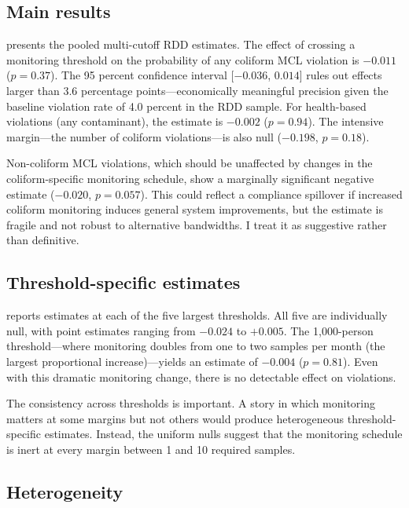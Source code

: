 \documentclass[12pt]{article}
\begin{document}
\subsection{Main results}



 presents the pooled multi-cutoff RDD estimates. The effect of crossing a monitoring threshold on the probability of any coliform MCL violation is $-0.011$ ($p = 0.37$). The 95 percent confidence interval [$-0.036$, $0.014$] rules out effects larger than 3.6 percentage points---economically meaningful precision given the baseline violation rate of 4.0 percent in the RDD sample. For health-based violations (any contaminant), the estimate is $-0.002$ ($p = 0.94$). The intensive margin---the number of coliform violations---is also null ($-0.198$, $p = 0.18$).

Non-coliform MCL violations, which should be unaffected by changes in the coliform-specific monitoring schedule, show a marginally significant negative estimate ($-0.020$, $p = 0.057$). This could reflect a compliance spillover if increased coliform monitoring induces general system improvements, but the estimate is fragile and not robust to alternative bandwidths. I treat it as suggestive rather than definitive.

\subsection{Threshold-specific estimates}



 reports estimates at each of the five largest thresholds. All five are individually null, with point estimates ranging from $-0.024$ to $+0.005$. The 1,000-person threshold---where monitoring doubles from one to two samples per month (the largest proportional increase)---yields an estimate of $-0.004$ ($p = 0.81$). Even with this dramatic monitoring change, there is no detectable effect on violations.

The consistency across thresholds is important. A story in which monitoring matters at some margins but not others would produce heterogeneous threshold-specific estimates. Instead, the uniform nulls suggest that the monitoring schedule is inert at every margin between 1 and 10 required samples.

\subsection{Heterogeneity}
\end{document}
